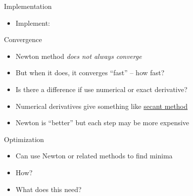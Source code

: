 \begin{frame}[fragile]{Implementation}
\protect\hypertarget{implementation-1}{}

\begin{itemize}
\item
  Implement:

\begin{Shaded}
\begin{Highlighting}[]
\NormalTok{)}

     

\end{Highlighting}
\end{Shaded}
\end{itemize}

\end{frame}

\begin{frame}{Convergence}
\protect\hypertarget{convergence}{}

\begin{itemize}
\item
  Newton method \emph{does not always converge}
\item
  But when it does, it converges ``fast'' -- how fast?
\item
  Is there a difference if use numerical or exact derivative?
\item
  Numerical derivatives give something like
  \href{https://en.wikipedia.org/wiki/Secant_method}{secant method}
\item
  Newton is ``better'' but each step may be more expensive
\end{itemize}

\end{frame}

\begin{frame}{Optimization}
\protect\hypertarget{optimization}{}

\begin{itemize}
\item
  Can use Newton or related methods to find minima
\item
  How?
\item
  What does this need?
\end{itemize}

\end{frame}

